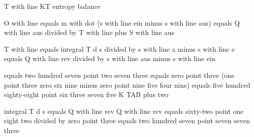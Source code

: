 T with line KT entropy balance

O with line equals m with dot (s with line ein minus s with line aus) equals Q with line aus divided by T with line plus S with line aus

T with line equals integral T d s divided by s with line a minus s with line e equals Q with line rev divided by s with line aus minus s with line ein

equals two hundred seven point two seven three
equals zero point three (one point three zero six nine minus zero point nine five four nine)
equals five hundred eighty-eight point six three seven five K TAB plus two

integral T d s equals Q with line rev
Q with line rev equals sixty-two point one eight two divided by zero point three
equals two hundred seven point seven seven three